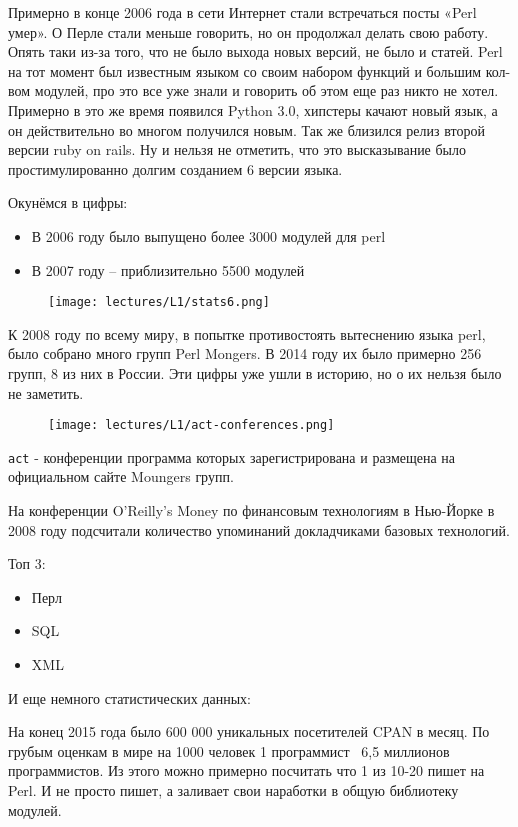 Примерно в конце 2006 года в сети Интернет стали встречаться посты «Perl умер». О Перле стали меньше говорить, но он продолжал делать свою работу. Опять таки из-за того, что не было выхода новых версий, не было и статей. Perl на тот момент был известным языком со своим набором функций и большим кол-вом модулей, про это все уже знали и говорить об этом еще раз никто не хотел. Примерно в это же время появился Python 3.0, хипстеры качают новый язык, а он действительно во многом получился новым. Так же близился релиз второй версии ruby on rails. Ну и нельзя не отметить, что это высказывание было простимулированно долгим созданием 6 версии языка.

Окунёмся в цифры:
\begin{itemize}
 \item В 2006 году было выпущено более 3000 модулей для perl
 \item В 2007 году -- приблизительно 5500 модулей
\end{itemize}

\begin{figure}[H] \centering
  \texttt{[image: lectures/L1/stats6.png]}
\end{figure}\noindent

К 2008 году по всему миру, в попытке противостоять вытеснению языка perl, было собрано много групп Perl Mongers. В 2014 году их было примерно 256 групп, 8 из них в России. Эти цифры уже ушли в историю, но о их нельзя было не заметить.

\begin{figure}[H] \centering
  \texttt{[image: lectures/L1/act-conferences.png]}
\end{figure}\noindent

\verb|act| - конференции программа которых зарегистрирована и размещена на официальном сайте Moungers групп.

На конференции O'Reilly's Money по финансовым технологиям в Нью-Йорке в 2008 году подсчитали количество упоминаний докладчиками базовых технологий.

Топ 3:
\begin{itemize}
 \item Перл
 \item SQL
 \item XML
\end{itemize}

И еще немного статистических данных:

На конец 2015 года было 600 000 уникальных посетителей CPAN в месяц. По грубым оценкам в мире на 1000 человек 1 программист ~6,5 миллионов программистов. Из этого можно примерно посчитать что 1 из 10-20 пишет на Perl. И не просто пишет, а заливает свои наработки в общую библиотеку модулей.


